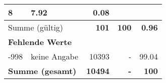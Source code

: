 \begin{longtable}{lXrrr}
       \num{8} &
       \num[round-mode=places,round-precision=2]{7,92} &
         \num[round-mode=places,round-precision=2]{0,08} \\
     \midrule
     \multicolumn{2}{l}{Summe (gültig)} &
       \textbf{\num{101}} &
     \textbf{100} &
       \textbf{\num[round-mode=places,round-precision=2]{0,96}} \\
     \multicolumn{5}{l}{\textbf{Fehlende Werte}}\\
       -998 &
       keine Angabe &
         \num{10393} &
        - &
         \num[round-mode=places,round-precision=2]{99,04} \\
     \midrule
     \multicolumn{2}{l}{\textbf{Summe (gesamt)}} &
          \textbf{\num{10494}} &
        \textbf{-} &
        \textbf{100} \\
     \bottomrule
     \end{longtable}
     
